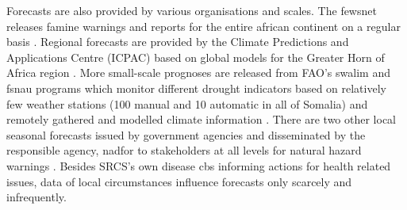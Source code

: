 Forecasts are also provided by various organisations and scales. The \acrshort*{fewsnet} releases famine warnings and reports for the entire african continent on a regular basis \autocite{fewsnetFamineEarlyWarning2023}. Regional forecasts are provided by the Climate Predictions and Applications Centre (ICPAC) based on global models for the Greater Horn of Africa region \autocite{icpacDeliveringClimateServices2023}. More small-scale prognoses are released from FAO's \acrshort*{swalim} and \acrshort*{fsnau} programs which monitor different drought indicators based on relatively few weather stations (100 manual and 10 automatic in all of Somalia) and remotely gathered and modelled climate information \autocite{faoswalimSWALIMWeatherMonitoring2014,somaliredcrescentsocietyFeasibilityStudyPotential2022}. There are two other local seasonal forecasts issued by government agencies and disseminated by the responsible agency, \acrshort*{nadfor} to stakeholders at all levels for natural hazard warnings \autocite{somaliredcrescentsocietyFeasibilityStudyPotential2022}. Besides SRCS's own disease \acrshort*{cbs} informing actions for health related issues, data of local circumstances influence forecasts only scarcely and infrequently.

